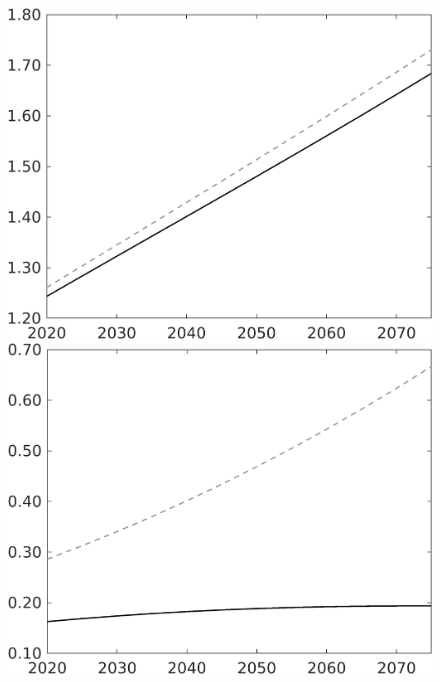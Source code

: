 \documentclass[12pt]{article}
\begin{document}
\begin{figure}[h!!]
\begin{minipage}[]{0.32\textwidth}
	\end{minipage}	
	\begin{minipage}[]{0.32\textwidth}
		\includegraphics[width=1\textwidth]{../../codding_model/own_basedOnFried/optimalPol_010922_revision/figures/all_13Sept22/LevTaufNoTauf_TaulCalib_regime0_C_spillover0_nsk1_xgr1_knspil1_sep1_LFlimit0_emsbase0_countec0_GovRev0_etaa0.79_lgd0.png}
	\end{minipage}	
	\begin{minipage}[]{0.32\textwidth}
		\includegraphics[width=1\textwidth]{../../codding_model/own_basedOnFried/optimalPol_010922_revision/figures/all_13Sept22/LevTaufNoTauf_TaulCalib_regime0_F_spillover0_nsk1_xgr1_knspil1_sep1_LFlimit0_emsbase0_countec0_GovRev0_etaa0.79_lgd0.png}

\end{minipage}
\end{figure}
\end{document}

